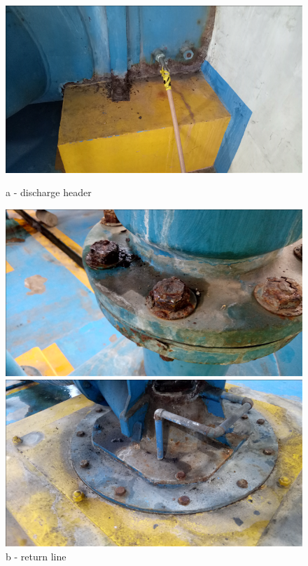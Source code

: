 \begin{figure} [!htb]
	\begin{minipage}[b]{0.225\linewidth}
		\centering
		\includegraphics[width=\textwidth]{figures/fig_ch043_corrosion_1}
		\caption*{a - discharge header}
	\end{minipage}
	\hspace{0.05cm}
	\begin{minipage}[b]{0.225\linewidth}
		\centering
		\includegraphics[width=\textwidth]{figures/fig_ch043_corrosion_3}
		\caption*{b - return line}
	\end{minipage}
	\hspace{0.05cm}
	\begin{minipage}[b]{0.225\linewidth}
		\centering
		\includegraphics[width=\textwidth]{figures/fig_ch043_corrosion_2}

\end{minipage}
\end{figure}
